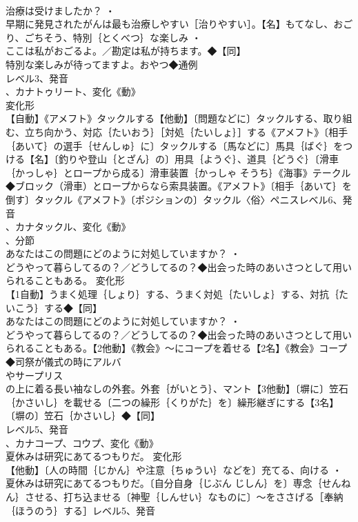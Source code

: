 \documentclass[8pt]{extreport}
\begin{document}
\begin{CJK}{UTF8}{min}
\\	治療は受けましたか？ ・
\\	早期に発見されたがんは最も治療しやすい［治りやすい］。【名】もてなし、おごり、ごちそう、特別｛とくべつ｝な楽しみ ・
\\	ここは私がおごるよ。／勘定は私が持ちます。◆【同】
\\	特別な楽しみが待ってますよ。おやつ◆通例
\\	レベル3、発音
\\	、カナトゥリート、変化《動》
\\	変化形 
\\	【自動】《アメフト》タックルする【他動】〔問題などに〕タックルする、取り組む、立ち向かう、対応｛たいおう｝［対処｛たいしょ｝］する《アメフト》〔相手｛あいて｝の選手｛せんしゅ｝に〕タックルする〔馬などに〕馬具｛ばぐ｝をつける【名】〔釣りや登山｛とざん｝の〕用具｛ようぐ｝、道具｛どうぐ｝〔滑車｛かっしゃ｝とロープから成る〕滑車装置｛かっしゃ そうち｝《海事》テークル◆ブロック（滑車）とロープからなら索具装置。《アメフト》〔相手｛あいて｝を倒す〕タックル《アメフト》〔ポジションの〕タックル〈俗〉ペニスレベル6、発音
\\	、カナタックル、変化《動》
\\	、分節
\\	あなたはこの問題にどのように対処していますか？ ・
\\	どうやって暮らしてるの？／どうしてるの？◆出会った時のあいさつとして用いられることもある。	変化形 
\\	【1自動】うまく処理｛しょり｝する、うまく対処｛たいしょ｝する、対抗｛たいこう｝する◆【同】
\\	あなたはこの問題にどのように対処していますか？ ・
\\	どうやって暮らしてるの？／どうしてるの？◆出会った時のあいさつとして用いられることもある。【2他動】《教会》～にコープを着せる【2名】《教会》コープ◆司祭が儀式の時にアルバ
\\	やサープリス
\\	の上に着る長い袖なしの外套。外套｛がいとう｝、マント【3他動】〔塀に〕笠石｛かさいし｝を載せる〔二つの繰形｛くりがた｝を〕繰形継ぎにする【3名】〔塀の〕笠石｛かさいし｝◆【同】
\\	レベル5、発音
\\	、カナコープ、コウプ、変化《動》
\\	夏休みは研究にあてるつもりだ。	変化形 
\\	【他動】〔人の時間｛じかん｝や注意｛ちゅうい｝などを〕充てる、向ける ・
\\	夏休みは研究にあてるつもりだ。〔自分自身｛じぶん じしん｝を〕専念｛せんねん｝させる、打ち込ませる〔神聖｛しんせい｝なものに〕～をささげる［奉納｛ほうのう｝する］レベル5、発音

\end{CJK}
\end{document}
